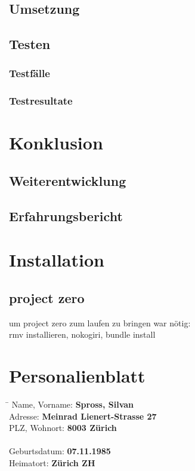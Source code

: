 \documentclass[abstracton,liststotoc,bibtotoc]{scrreprt}
\begin{document}
    \section{Umsetzung}
    \section{Testen}
    \subsection{Testfälle}
    \subsection{Testresultate}
    
    \chapter{Konklusion}
    \section{Weiterentwicklung}
    \section{Erfahrungsbericht}
    
    \chapter{Installation}
    \section{project zero}
    um project zero zum laufen zu bringen war nötig:\\
    rmv installieren, nokogiri, bundle install
    
    \appendix
    
    \chapter{Personalienblatt}
    \begin{tabbing}
    	\hspace*{4cm}   \= \kill
    	Name, Vorname:  \> {\bf Spross, Silvan} \\
    	Adresse:        \> {\bf Meinrad Lienert-Strasse 27} \\
    	PLZ, Wohnort:   \> {\bf 8003 Zürich} \\
    	\\
    	Geburtsdatum:   \> {\bf 07.11.1985} \\
    	Heimatort:      \> {\bf Zürich ZH} \\
    \end{tabbing}
    
\end{document}
